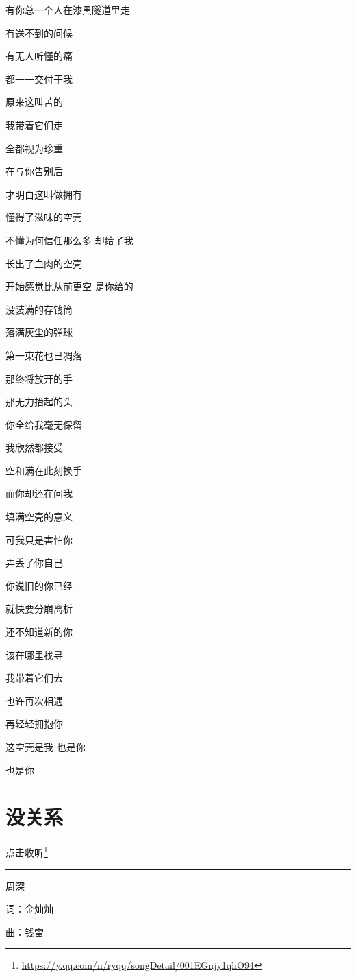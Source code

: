 \documentclass[]{ctexbook}
\renewcommand{\href}[2]{#2\footnote{\url{#1}}}
\begin{document}
有你总一个人在漆黑隧道里走

有送不到的问候

有无人听懂的痛

都一一交付于我

原来这叫苦的

我带着它们走

全都视为珍重

在与你告别后

才明白这叫做拥有

懂得了滋味的空壳

不懂为何信任那么多 却给了我

长出了血肉的空壳

开始感觉比从前更空 是你给的

没装满的存钱筒

落满灰尘的弹球

第一束花也已凋落

那终将放开的手

那无力抬起的头

你全给我毫无保留

我欣然都接受

空和满在此刻换手

而你却还在问我

填满空壳的意义

可我只是害怕你

弄丢了你自己

你说旧的你已经

就快要分崩离析

还不知道新的你

该在哪里找寻

我带着它们去

也许再次相遇

再轻轻拥抱你

这空壳是我 也是你

也是你

\section*{没关系}\label{life-is-like-a-box-of-chocolates}


\href{https://y.qq.com/n/ryqq/songDetail/001EGnjy1qhO94}{点击收听}

\begin{center}\rule{0.5\linewidth}{0.5pt}\end{center}

周深

词：金灿灿

曲：钱雷
\end{document}
